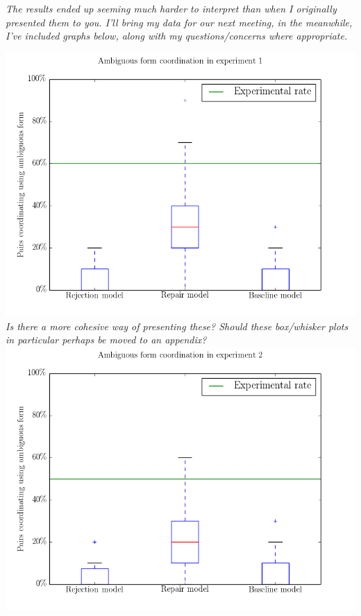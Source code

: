 \documentclass[12pt,a4paper]{article}
\begin{document}
\textit{The results ended up seeming much harder to interpret than when I originally presented them to you. I'll bring my data for our next meeting, in the meanwhile, I've included graphs below, along with my questions/concerns where appropriate.}

\begin{center}
\includegraphics[width=\textwidth]{ambi_coord_exp1.png}
\textit{Is there a more cohesive way of presenting these? Should these box/whisker plots in particular perhaps be moved to an appendix?}
\includegraphics[width=\textwidth]{ambi_coord_exp2.png}

\end{center}
\end{document}
